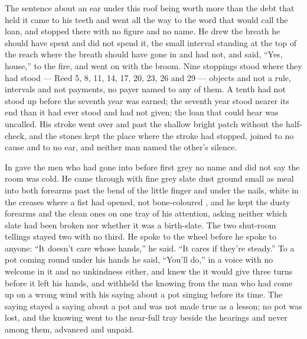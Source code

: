 The sentence about an ear under this roof being worth more than the debt that held it came to his teeth and went all the way to the word that would call the loan, and stopped there with no figure and no name. He drew the breath he should have spent and did not spend it, the small interval standing at the top of the reach where the breath should have gone in and had not, and said, “Yes, house,” to the fire, and went on with the broom. Nine stoppings stood where they had stood --- Reed 5, 8, 11, 14, 17, 20, 23, 26 and 29 --- objects and not a rule, intervals and not payments, no payer named to any of them. A tenth had not stood up before the seventh year was earned; the seventh year stood nearer its end than it had ever stood and had not given; the loan that could hear was uncalled. His stroke went over  and past the shallow bright patch without the half-check, and the stones kept the place where the stroke had stopped, joined to no cause and to no ear, and neither man named the other's silence.

\scenebreak

In   gave the men who had gone into  before first grey no name and did not say the room was cold. He came through with fine grey slate dust ground small as meal into both forearms past the bend of the little finger and under the nails, white in the creases where a fist had opened, not bone-coloured , and he kept the dusty forearms and the clean ones on one tray of his attention, asking neither which slate had been broken nor whether it was a birth-slate. The two shut-room tellings stayed two with no third. He spoke to the wheel before he spoke to anyone: “It doesn't care whose hands,” he said. “It cares if they're steady.” To a pot coming round under his hands he said, “You'll do,” in a voice with no welcome in it and no unkindness either, and knew the  it would give three turns before it left his hands, and withheld the knowing from the man who had come up on a wrong wind with his saying about a pot singing before its time. The saying stayed a saying about a pot and was not made true as a lesson; no pot was lost, and the knowing went to the near-full tray beside the hearings and never among them, advanced and unpaid.

